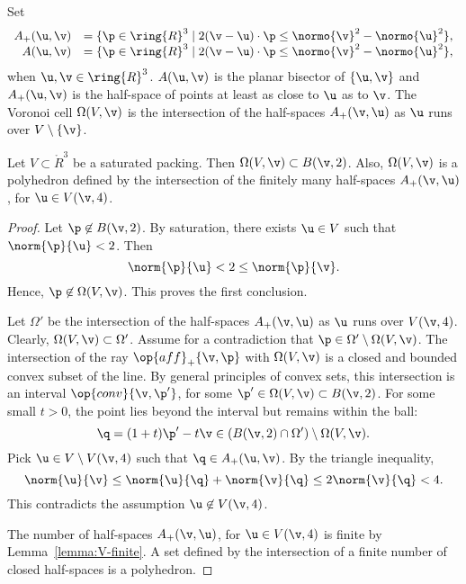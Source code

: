 \begin{remark}
Set
\begin{displaymath}
\begin{array}{rll}
A_+(\u,\v) &= \{\p\in\ring{R}^3
\mid 2(\v-\u)\cdot \p \le \normo{\v}^2 - \normo{\u}^2 \},\\
A(\u,\v) &= \{\p\in\ring{R}^3
\mid 2(\v-\u)\cdot \p \le \normo{\v}^2 - \normo{\u}^2 \},\\
\end{array}
\end{displaymath}
when $\u,\v\in\ring{R}^3$.  $A(\u,\v)$ is the planar bisector of
$\{\u,\v\}$ and $A_+(\u,\v)$ is the half-space of points at least as
close to $\u$ as to $\v$.  The Voronoi cell $\Omega(V,\v)$ is the
intersection of the half-spaces $A_+(\v,\u)$ as $\u$ runs over
$V\setminus \{\v\}$.
\end{remark}

\begin{lemma}\label{lemma:V4}
Let $V\subset\ring{R}^3$ be a saturated packing.    Then $\Omega(V,\v)\subset  B(\v,2)$.
Also, $\Omega(V,\v)$ is a polyhedron defined by the intersection of the  finitely many
half-spaces $A_+(\v,\u)$, for $\u\in V(\v,4)$. 
\end{lemma}

\begin{proof} Let $\p\not\in B(\v,2)$.  
By saturation, there exists $\u\in V$ such that $\norm{\p}{\u}<2$.
Then 
\begin{displaymath}
\norm{\p}{\u} < 2 \le \norm{\p}{\v}.
\end{displaymath}
Hence, $\p\not\in\Omega(V,\v)$.  This proves the first conclusion.


Let $\Omega'$ be the intersection of the half-spaces $A_+(\v,\u)$ as $\u$ runs
over $V(\v,4)$.  Clearly, $\Omega(V,\v)\subset \Omega'$.  Assume for a contradiction
that $\p\in \Omega'\setminus\Omega(V,\v)$.  The intersection of the ray $\op{aff}_+\{\v,\p\}$
with $\Omega(V,\v)$ is a closed and bounded  convex subset of the line.  By general
principles of convex sets, this intersection is an interval $\op{conv}\{\v,\p'\}$, for some
$\p'\in\Omega(V,\v)\subset B(\v,2)$.   For some small $t>0$,  the point lies beyond
the interval but remains within the ball:
\begin{displaymath}
\q = (1+t)\p' -t \v\in (B(\v,2)\cap \Omega')\setminus \Omega(V,\v).
\end{displaymath}
Pick $\u\in V\setminus V(\v,4)$ such that $\q\in A_+(\u,\v)$.  By the triangle inequality,
\begin{displaymath}
\norm{\u}{\v} \le \norm{\u}{\q} + \norm{\v}{\q} \le 2\norm{\v}{\q} < 4.
\end{displaymath}
This contradicts the assumption $\u\not\in V(\v,4)$.

The number of half-spaces $A_+(\v,\u)$, for $\u\in V(\v,4)$ is finite by
Lemma~\ref{lemma:V-finite}.  A set defined by the intersection of a finite number
of closed half-spaces is a polyhedron.
\end{proof}

